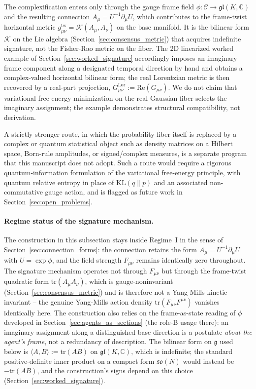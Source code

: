 \documentclass[11pt]{article}
\begin{document}
The complexification enters only through the gauge frame field $\phi: \mathcal{C} \to \mathfrak{gl}(K, \mathbb{C})$ and the resulting connection $A_\mu = U^{-1} \partial_\mu U$, which contributes to the frame-twist horizontal metric $g^{\mathrm{tw}}_{\mu\nu} = \mathcal{K}(A_\mu, A_\nu)$ on the base manifold. It is the bilinear form $\mathcal{K}$ on the Lie algebra (Section~\ref{sec:consensus_metric}) that acquires indefinite signature, not the Fisher-Rao metric on the fiber. The 2D linearized worked example of Section~\ref{sec:worked_signature} accordingly imposes an imaginary frame component along a designated temporal direction by hand and obtains a complex-valued horizontal bilinear form; the real Lorentzian metric is then recovered by a real-part projection, $G^{\mathrm{Lor}}_{\mu\nu} := \mathrm{Re}(G_{\mu\nu})$. We do not claim that variational free-energy minimization on the real Gaussian fiber selects the imaginary assignment; the example demonstrates structural compatibility, not derivation.

A strictly stronger route, in which the probability fiber itself is replaced by a complex or quantum statistical object such as density matrices on a Hilbert space, Born-rule amplitudes, or signed/complex measures, is a separate program that this manuscript does not adopt. Such a route would require a rigorous quantum-information formulation of the variational free-energy principle, with quantum relative entropy in place of $\mathrm{KL}(q \| p)$ and an associated non-commutative gauge action, and is flagged as future work in Section~\ref{sec:open_problems}.

\paragraph{Regime status of the signature mechanism.} The construction in this subsection stays inside Regime~I in the sense of Section~\ref{sec:connection_forms}: the connection retains the form $A_\mu = U^{-1}\partial_\mu U$ with $U = \exp\phi$, and the field strength $F_{\mu\nu}$ remains identically zero throughout. The signature mechanism operates not through $F_{\mu\nu}$ but through the frame-twist quadratic form $\mathrm{tr}(A_\mu A_\nu)$, which is gauge-noninvariant (Section~\ref{sec:consensus_metric}) and is therefore not a Yang-Mills kinetic invariant -- the genuine Yang-Mills action density $\mathrm{tr}(F_{\mu\nu}F^{\mu\nu})$ vanishes identically here. The construction also relies on the frame-as-state reading of $\phi$ developed in Section~\ref{sec:agents_as_sections} (the role-B usage there): an imaginary assignment along a distinguished base direction is a postulate \emph{about the agent's frame}, not a redundancy of description. The bilinear form on $\mathfrak{g}$ used below is $\langle A, B\rangle := \mathrm{tr}(AB)$ on $\mathfrak{gl}(K, \mathbb{C})$, which is indefinite; the standard positive-definite inner product on a compact form $\mathfrak{so}(N)$ would instead be $-\mathrm{tr}(AB)$, and the construction's signs depend on this choice (Section~\ref{sec:worked_signature}).
\end{document}

